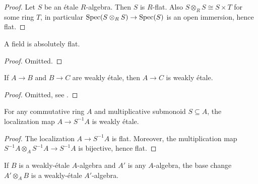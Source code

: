\begin{proof}
    \leanok
    Let $S$ be an étale $R$-algebra. Then $S$ is $R$-flat. Also
    $S \otimes_{R} S \cong S × T$ for some ring $T$, in particular $\mathrm{Spec}(S \otimes_{R} S) \to \mathrm{Spec}(S)$ is
    an open immersion, hence flat.
\end{proof}

\begin{lemma}
    \label{lem:field-absolutely-flat}
    A field is absolutely flat.
    \leanok
\end{lemma}

\begin{proof}
    \leanok
    Omitted.
\end{proof}

\begin{lemma}[\stacksproject{092J}]
    \label{lem:weakly-etale-comp}
    \leanok
    If $A \to B$ and $B \to C$ are weakly étale, then $A \to C$ is weakly étale.
\end{lemma}

\begin{proof}
    \leanok
    Omitted, see .
\end{proof}

\begin{lemma}[\stacksproject{092J}]
    \label{lem:weakly-etale-localization}
    \leanok
    For any commutative ring $A$ and multiplicative submonoid $S \subseteq A$, the
    localization map $A \to S^{-1} A$ is weakly étale.
\end{lemma}

\begin{proof}
    \leanok
    The localization $A \to S^{-1} A$ is flat. Moreover, the multiplication map
    $S^{-1} A \otimes_{A} S^{-1} A \to S^{-1} A$ is bijective, hence flat.
\end{proof}

\begin{lemma}[\stacksproject{092H}]
    \label{lem:weakly-etale-base-change}
    If $B$ is a weakly-étale $A$-algebra and $A'$ is any $A$-algebra, the base change
    $A' \otimes_{A} B$ is a weakly-étale $A'$-algebra.
    \leanok
    \mathlibok
\end{lemma}

